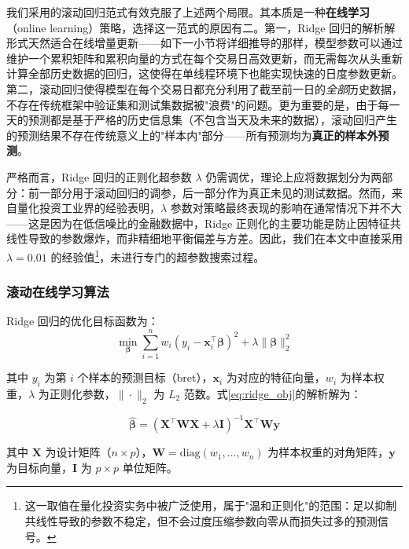 \documentclass{article}
\begin{document}
我们采用的滚动回归范式有效克服了上述两个局限。其本质是一种\textbf{在线学习}（online learning）策略，选择这一范式的原因有二。第一，Ridge 回归的解析解形式天然适合在线增量更新——如下一小节将详细推导的那样，模型参数可以通过维护一个累积矩阵和累积向量的方式在每个交易日高效更新，而无需每次从头重新计算全部历史数据的回归，这使得在单线程环境下也能实现快速的日度参数更新。第二，滚动回归使得模型在每个交易日都充分利用了截至前一日的\textit{全部}历史数据，不存在传统框架中验证集和测试集数据被"浪费"的问题。更为重要的是，由于每一天的预测都是基于严格的历史信息集（不包含当天及未来的数据），滚动回归产生的预测结果不存在传统意义上的"样本内"部分——所有预测均为\textbf{真正的样本外预测}。

严格而言，Ridge 回归的正则化超参数 $\lambda$ 仍需调优，理论上应将数据划分为两部分：前一部分用于滚动回归的调参，后一部分作为真正未见的测试数据。然而，来自量化投资工业界的经验表明，$\lambda$ 参数对策略最终表现的影响在通常情况下并不大——这是因为在低信噪比的金融数据中，Ridge 正则化的主要功能是防止因特征共线性导致的参数爆炸，而非精细地平衡偏差与方差。因此，我们在本文中直接采用 $\lambda = 0.01$ 的经验值\footnote{这一取值在量化投资实务中被广泛使用，属于"温和正则化"的范围：足以抑制共线性导致的参数不稳定，但不会过度压缩参数向零从而损失过多的预测信号。}，未进行专门的超参数搜索过程。

\subsubsection{滚动在线学习算法}
\label{sec:rolling_algorithm}

Ridge 回归的优化目标函数为：
\begin{equation}
    \min_{\boldsymbol{\beta}} \sum_{i=1}^{n} w_i \left(y_i - \mathbf{x}_i^{\top} \boldsymbol{\beta}\right)^2 + \lambda \|\boldsymbol{\beta}\|_2^2
    \label{eq:ridge_obj}
\end{equation}

\noindent 其中 $y_i$ 为第 $i$ 个样本的预测目标（bret），$\mathbf{x}_i$ 为对应的特征向量，$w_i$ 为样本权重，$\lambda$ 为正则化参数，$\|\cdot\|_2$ 为 $L_2$ 范数。式\ref{eq:ridge_obj}的解析解为：

\begin{equation}
    \hat{\boldsymbol{\beta}} = \left(\mathbf{X}^{\top} \mathbf{W} \mathbf{X} + \lambda \mathbf{I}\right)^{-1} \mathbf{X}^{\top} \mathbf{W} \mathbf{y}
    \label{eq:ridge_solution}
\end{equation}

\noindent 其中 $\mathbf{X}$ 为设计矩阵（$n \times p$），$\mathbf{W} = \text{diag}(w_1, \ldots, w_n)$ 为样本权重的对角矩阵，$\mathbf{y}$ 为目标向量，$\mathbf{I}$ 为 $p \times p$ 单位矩阵。
\end{document}
